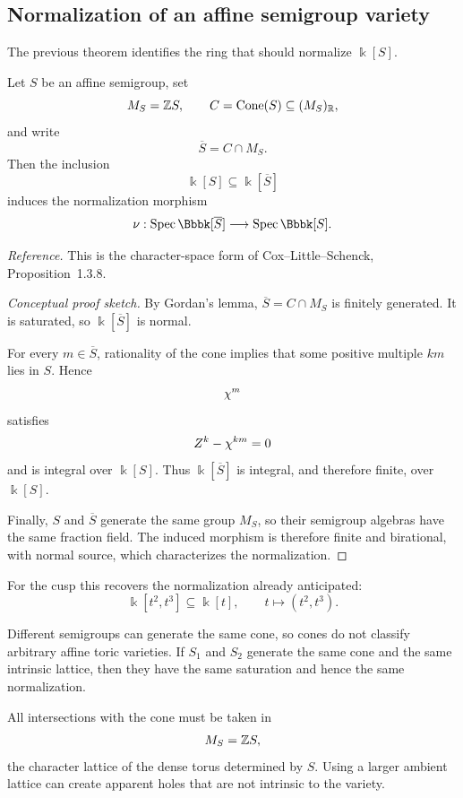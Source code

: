 \subsection{Normalization of an affine semigroup variety}

The previous theorem identifies the ring that should normalize
\(\Bbbk[S]\).

\begin{proposition}
\label{prop:normalization-semigroup-variety}
Let \(S\) be an affine semigroup, set
\[
M_S=\mathbb{Z} S,
\qquad
C=\operatorname{Cone}(S)\subseteq(M_S)_{\mathbb{R}},
\]
and write
\[
\overline S=C\cap M_S.
\]
Then the inclusion
\[
\Bbbk[S]\subseteq\Bbbk[\overline S]
\]
induces the normalization morphism
\[
\nu:
\Spec\Bbbk[\overline S]
\longrightarrow
\Spec\Bbbk[S].
\]
\end{proposition}

\noindent
\textit{Reference.}
This is the character-space form of Cox--Little--Schenck,
Proposition~1.3.8.

\begin{proof}[Conceptual proof sketch]
By Gordan's lemma, \(\overline S=C\cap M_S\) is finitely generated.
It is saturated, so \(\Bbbk[\overline S]\) is normal.

For every \(m\in\overline S\), rationality of the cone implies that
some positive multiple \(km\) lies in \(S\). Hence
\[
\chi^{m}
\]
satisfies
\[
Z^k-\chi^{km}=0
\]
and is integral over \(\Bbbk[S]\). Thus
\(\Bbbk[\overline S]\) is integral, and therefore finite, over
\(\Bbbk[S]\).

Finally, \(S\) and \(\overline S\) generate the same group \(M_S\), so
their semigroup algebras have the same fraction field. The induced
morphism is therefore finite and birational, with normal source,
which characterizes the normalization.
\end{proof}

For the cusp this recovers the normalization already anticipated:
\[
\Bbbk[t^2,t^3]\subseteq\Bbbk[t],
\qquad
t\longmapsto(t^2,t^3).
\]

Different semigroups can generate the same cone, so cones do not
classify arbitrary affine toric varieties. If \(S_1\) and \(S_2\)
generate the same cone and the same intrinsic lattice, then they have
the same saturation and hence the same normalization.

All intersections with the cone must be taken in
\[
M_S=\mathbb{Z} S,
\]
the character lattice of the dense torus determined by \(S\). Using a
larger ambient lattice can create apparent holes that are not
intrinsic to the variety.

